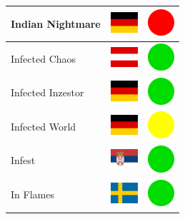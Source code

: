 \documentclass[12pt, a4paper, twoside]{report}
\begin{document}
\begin{center}
\begin{longtable}{|p{5cm}|p{2cm}|p{2cm}|}
 Indian Nightmare                                           & \includegraphics[width=1cm]{4x3/de} &   \includegraphics[width=1cm]{likes/n} \\ \hline
 Infected Chaos                                             & \includegraphics[width=1cm]{4x3/at} &   \includegraphics[width=1cm]{likes/y} \\ \hline
 Infected Inzestor                                          & \includegraphics[width=1cm]{4x3/de} &   \includegraphics[width=1cm]{likes/y} \\ \hline
 Infected World                                             & \includegraphics[width=1cm]{4x3/de} &   \includegraphics[width=1cm]{likes/m} \\ \hline
 Infest                                                     & \includegraphics[width=1cm]{4x3/rs} &   \includegraphics[width=1cm]{likes/y} \\ \hline
 In Flames                                                  & \includegraphics[width=1cm]{4x3/se} &   \includegraphics[width=1cm]{likes/y} \\ \hline

\end{longtable}
\end{center}
\end{document}

